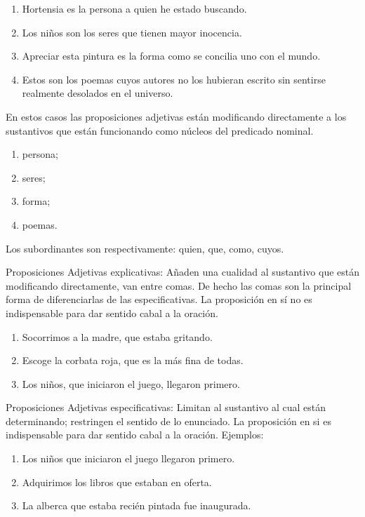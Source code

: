\begin{lista}
\begin{ejems}{}
\begin{enumerate}
\item Hortensia es la persona \textsf{a quien he estado buscando}. 
\item Los niños son los seres \textsf{que tienen mayor inocencia}. 
\item Apreciar esta pintura es la forma\textsf{ como se concilia uno con
el mundo}. 
\item Estos son los poemas \textsf{cuyos autores no los hubieran escrito
sin sentirse realmente desolados en el universo}.
\end{enumerate}
\end{ejems}

En estos casos las proposiciones adjetivas están modificando directamente
a los sustantivos que están funcionando como núcleos del predicado
nominal. 
\begin{enumerate}
\item persona; 
\item seres; 
\item forma; 
\item poemas. 
\end{enumerate}
Los subordinantes son respectivamente: quien, que, como, cuyos.

\item Proposiciones Adjetivas explicativas: Añaden una cualidad al
sustantivo que están modificando directamente,\textsf{ van entre comas}.
De hecho las comas son la principal forma de diferenciarlas de las
especificativas. La proposición en sí no es indispensable para dar
sentido cabal a la oración. 

\begin{ejems}{}
\begin{enumerate}
\item Socorrimos a la madre, \textsf{que estaba gritando}. 
\item Escoge la corbata roja, \textsf{que es la más fina de todas}. 
\item Los niños, \textsf{que iniciaron el juego}, llegaron primero.
\end{enumerate}
\end{ejems}

\item Proposiciones Adjetivas especificativas: Limitan al sustantivo
al cual están determinando; restringen el sentido de lo enunciado.
La proposición en si es indispensable para dar sentido cabal a la
oración. Ejemplos:

\begin{ejems}{}
\begin{enumerate}
\item Los niños \textsf{que iniciaron el juego} llegaron primero. 
\item Adquirimos los libros \textsf{que estaban en oferta}. 
\item La alberca \textsf{que estaba recién pintada} fue inaugurada.
\end{enumerate}
\end{ejems}\end{lista}

